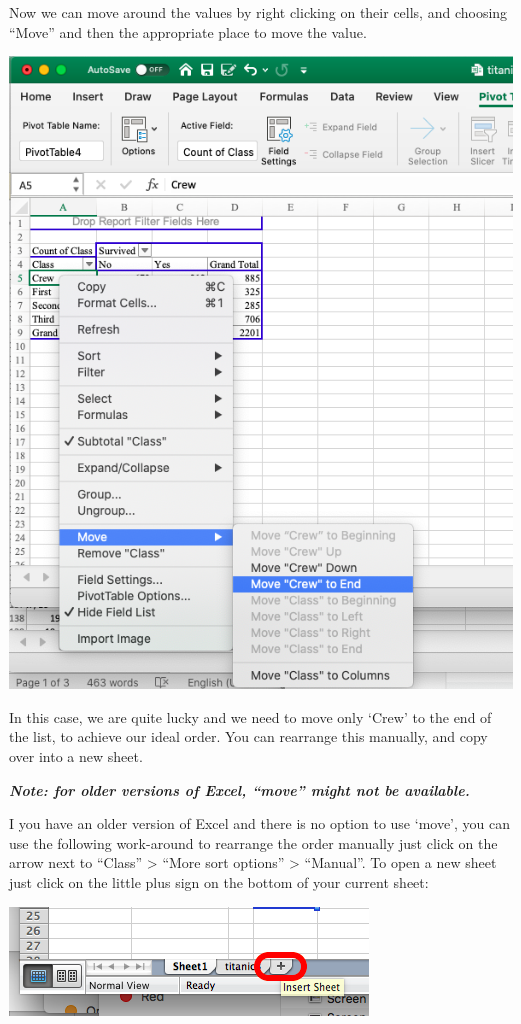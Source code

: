 \documentclass[
]{book}
\begin{document}
Now we can move around the values by right clicking on their cells, and choosing ``Move'' and then the appropriate place to move the value.

\includegraphics{imgs/rearrange_crew.png}

In this case, we are quite lucky and we need to move only `Crew' to the end of the list, to achieve our ideal order.
You can rearrange this manually, and copy over into a new sheet.

\textbf{\emph{Note: for older versions of Excel, ``move'' might not be available.}}

I you have an older version of Excel and there is no option to use `move', you can use the following work-around to rearrange the order manually just click on the arrow next to ``Class'' \textgreater{} ``More sort options'' \textgreater{} ``Manual''. To open a new sheet just click on the little plus sign on the bottom of your current sheet:

\includegraphics{imgs/new_sheet_2.png}
\end{document}
